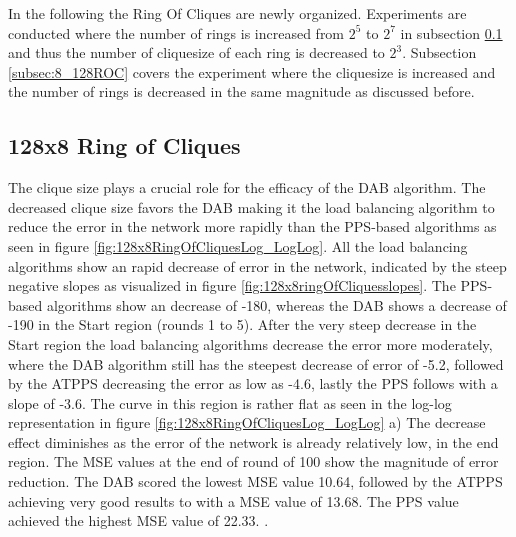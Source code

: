 In the following the Ring Of Cliques are newly organized. Experiments are conducted where the number of rings is increased from $2^{5}$ to $2^{7}$ in subsection \ref{subsec:128_8ROC} and thus the number of cliquesize of each ring is decreased to $2^{3}$. Subsection \ref{subsec:8_128ROC} covers the experiment where the cliquesize is increased and the number of rings is decreased in the same magnitude as discussed before.

\subsection{128x8 Ring of Cliques}\label{subsec:128_8ROC}
The clique size plays a crucial role for the efficacy of the DAB algorithm. The decreased clique size favors the DAB making it the load balancing algorithm to reduce the error in the network more rapidly than the PPS-based algorithms as seen in figure \ref{fig:128x8RingOfCliquesLog_LogLog}. All the load balancing algorithms show an rapid decrease of error in the network, indicated by the steep negative slopes as visualized in figure \ref{fig:128x8ringOfCliquesslopes}. The PPS-based algorithms show an decrease of -180, whereas the DAB shows a decrease of -190 in the Start region (rounds 1 to 5). After the very steep decrease in the Start region the load balancing algorithms decrease the error more moderately, where the DAB algorithm still has the steepest decrease of error of -5.2, followed by the ATPPS decreasing the error as low as -4.6, lastly the PPS follows with a slope of -3.6. The curve in this region is rather flat as seen in the log-log representation in figure \ref{fig:128x8RingOfCliquesLog_LogLog} a) The decrease effect diminishes as the error of the network is already relatively low, in the end region. The MSE values at the end of round of 100 show the magnitude of error reduction. The DAB scored the lowest MSE value 10.64, followed by the ATPPS achieving very good results to with a MSE value of 13.68. The PPS value achieved the highest MSE value of 22.33. .

